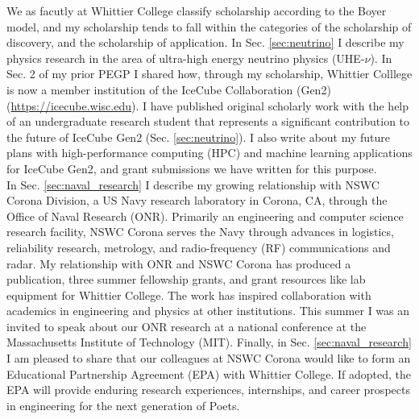 \documentclass[../../main.tex]{subfiles}
\begin{document}
\label{sec:scholarship}

We as facutly at Whittier College classify scholarship according to the Boyer model, and my scholarship tends to fall within the categories of the scholarship of discovery, and the scholarship of application.  In Sec. \ref{sec:neutrino} I describe my physics research in the area of ultra-high energy neutrino physics (UHE-$\nu$).  In Sec. 2 of my prior PEGP I shared how, through my scholarship, Whittier Colllege is now a member institution of the IceCube Collaboration (Gen2) (\url{https://icecube.wisc.edu}).  I have published original scholarly work with the help of an undergraduate research student that represents a significant contribution to the future of IceCube Gen2 (Sec. \ref{sec:neutrino}).  I also write about my future plans with high-performance computing (HPC) and machine learning applications for IceCube Gen2, and grant submissions we have written for this purpose.
\\
\vspace{0.25cm}
In Sec. \ref{sec:naval_research} I describe my growing relationship with NSWC Corona Division, a US Navy research laboratory in Corona, CA, through the Office of Naval Research (ONR).  Primarily an engineering and computer science research facility, NSWC Corona serves the Navy through advances in logistics, reliability research, metrology, and radio-frequency (RF) communications and radar.  My relationship with ONR and NSWC Corona has produced a publication, three summer fellowship grants, and grant resources like lab equipment for Whittier College.  The work has inspired collaboration with academics in engineering and physics at other institutions.  This summer I was an invited to speak about our ONR research at a national conference at the Massachusetts Institute of Technology (MIT).  Finally, in Sec. \ref{sec:naval_research} I am pleased to share that our colleagues at NSWC Corona would like to form an Educational Partnership Agreement (EPA) with Whittier College.  If adopted, the EPA will provide enduring research experiences, internships, and career prospects in engineering for the next generation of Poets.

\begin{flushleft}

\end{flushleft}

\begin{flushleft}

\end{flushleft}
\end{document}
